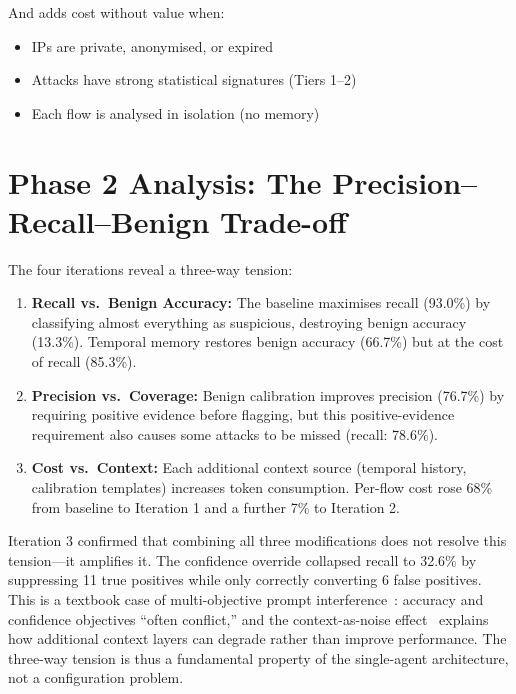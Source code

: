 \documentclass[12pt, a4paper, oneside]{report}
\begin{document}
And adds cost without value when:
\begin{itemize}
  \item IPs are private, anonymised, or expired
  \item Attacks have strong statistical signatures (Tiers 1--2)
  \item Each flow is analysed in isolation (no memory)
\end{itemize}


\section{Phase 2 Analysis: The Precision--Recall--Benign Trade-off}
\label{sec:phase2-discussion}

The four iterations reveal a three-way tension:

\begin{enumerate}
  \item \textbf{Recall vs.\ Benign Accuracy:} The baseline maximises recall
        (93.0\%) by classifying almost everything as suspicious, destroying
        benign accuracy (13.3\%). Temporal memory restores benign accuracy
        (66.7\%) but at the cost of recall (85.3\%).

  \item \textbf{Precision vs.\ Coverage:} Benign calibration improves precision
        (76.7\%) by requiring positive evidence before flagging, but this
        positive-evidence requirement also causes some attacks to be missed
        (recall: 78.6\%).

  \item \textbf{Cost vs.\ Context:} Each additional context source (temporal
        history, calibration templates) increases token consumption. Per-flow
        cost rose 68\% from baseline to Iteration 1 and a further 7\% to
        Iteration 2.
\end{enumerate}

Iteration 3 confirmed that combining all three modifications does not resolve
this tension---it amplifies it. The confidence override collapsed recall to
32.6\% by suppressing 11 true positives while only correctly converting 6
false positives. This is a textbook case of multi-objective prompt
interference~\cite{j6framework2025}: accuracy and confidence objectives ``often
conflict,'' and the context-as-noise effect~\cite{contextasnoise2026} explains how
additional context layers can degrade rather than improve performance. The three-way
tension is thus a fundamental property of the single-agent architecture, not a
configuration problem.
\end{document}
